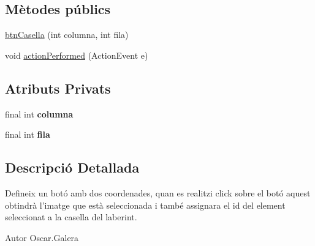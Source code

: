 \subsection*{Mètodes públics}
\begin{DoxyCompactItemize}
\item 
\hyperlink{classinterficie_1_1_f_editor_laberint_1_1btn_casella_ae67550e93349a5e598889aa7827c2bdd}{btn\+Casella} (int columna, int fila)
\item 
void \hyperlink{classinterficie_1_1_f_editor_laberint_1_1btn_casella_a123f23863ccbb77b78a1b230e77517eb}{action\+Performed} (Action\+Event e)
\end{DoxyCompactItemize}
\subsection*{Atributs Privats}
\begin{DoxyCompactItemize}
\item 
\hypertarget{classinterficie_1_1_f_editor_laberint_1_1btn_casella_a6212b591daf906dd3a42c0920bbd001d}{final int {\bfseries columna}}\label{classinterficie_1_1_f_editor_laberint_1_1btn_casella_a6212b591daf906dd3a42c0920bbd001d}

\item 
\hypertarget{classinterficie_1_1_f_editor_laberint_1_1btn_casella_a4ce68324671ce3de3a26f6d61e141007}{final int {\bfseries fila}}\label{classinterficie_1_1_f_editor_laberint_1_1btn_casella_a4ce68324671ce3de3a26f6d61e141007}

\end{DoxyCompactItemize}


\subsection{Descripció Detallada}
Defineix un botó amb dos coordenades, quan es realitzi click sobre el botó aquest obtindrà l'imatge que està seleccionada i també assignara el id del element seleccionat a la casella del laberint. 

\begin{DoxyAuthor}{Autor}
Oscar.\+Galera 
\end{DoxyAuthor}



